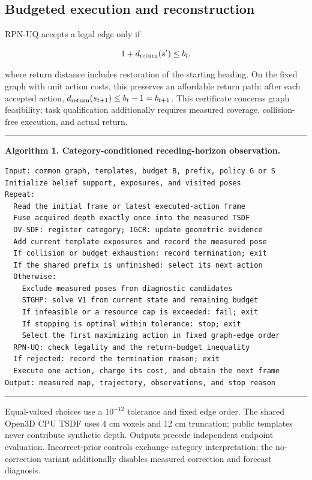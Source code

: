 \documentclass[pdflatex,sn-mathphys-num]{sn-jnl}
\begin{document}
\hypertarget{budgeted-execution-and-reconstruction}{%
\subsection{Budgeted execution and reconstruction}\label{budgeted-execution-and-reconstruction}}

RPN-UQ accepts a legal edge only if

\[
1+d_{\rm return}(s')\le b_t,
\]

where return distance includes restoration of the starting heading. On the fixed graph with unit action costs, this preserves an affordable return path: after each accepted action, \(d_{\rm return}(s_{t+1})\le b_t-1=b_{t+1}\). This certificate concerns graph feasibility; task qualification additionally requires measured coverage, collision-free execution, and actual return.

\par\medskip\noindent\begin{minipage}{\linewidth}
\small\hrule\vspace{0.6em}
\textbf{Algorithm 1. Category-conditioned receding-horizon observation.}

\begin{verbatim}
Input: common graph, templates, budget B, prefix, policy G or S
Initialize belief support, exposures, and visited poses
Repeat:
  Read the initial frame or latest executed-action frame
  Fuse acquired depth exactly once into the measured TSDF
  OV-SDF: register category; IGCR: update geometric evidence
  Add current template exposures and record the measured pose
  If collision or budget exhaustion: record termination; exit
  If the shared prefix is unfinished: select its next action
  Otherwise:
    Exclude measured poses from diagnostic candidates
    STGHP: solve V1 from current state and remaining budget
    If infeasible or a resource cap is exceeded: fail; exit
    If stopping is optimal within tolerance: stop; exit
    Select the first maximizing action in fixed graph-edge order
  RPN-UQ: check legality and the return-budget inequality
  If rejected: record the termination reason; exit
  Execute one action, charge its cost, and obtain the next frame
Output: measured map, trajectory, observations, and stop reason
\end{verbatim}
\vspace{0.4em}\hrule
\end{minipage}\par\medskip


Equal-valued choices use a \(10^{-12}\) tolerance and fixed edge order. The shared Open3D CPU TSDF \cite{ref4,ref11} uses 4 cm voxels and 12 cm truncation; public templates never contribute synthetic depth. Outputs precede independent endpoint evaluation. Incorrect-prior controls exchange category interpretation; the no-correction variant additionally disables measured correction and forecast diagnosis.
\end{document}
